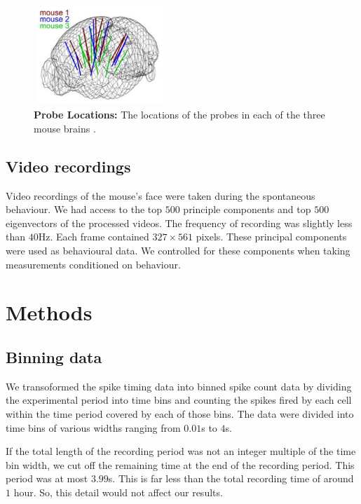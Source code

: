     \begin{figure}[h]
        \centering
        \includegraphics[width=5cm,height=3.75cm]{figures/eight_probe/probe_locations_stringer.png}
        \caption{\textbf{Probe Locations:} The locations of the probes in each of the three mouse brains \parencite{stringer}.}
        \label{fig:probe_locations}
    \end{figure}

    \subsection{Video recordings}\label{sec:video_recordings}
    Video recordings of the mouse's face were taken during the spontaneous behaviour. We had access to the top $500$ principle components and top $500$ eigenvectors of the processed videos. The frequency of recording was slightly less than $40$Hz. Each frame contained $327 \times 561$ pixels. These principal components were used as behavioural data. We controlled for these components when taking measurements conditioned on behaviour.

\section{Methods}
    \subsection{Binning data}
    We transoformed the spike timing data into binned spike count data by dividing the experimental period into time bins and counting the spikes fired by each cell within the time period covered by each of those bins. The data were divided into time bins of various widths ranging from $0.01$s to $4$s.

    If the total length of the recording period was not an integer multiple of the time bin width, we cut off the remaining time at the end of the recording period. This period was at most $3.99$s. This is far less than the total recording time of around $1$ hour. So, this detail would not affect our results.

